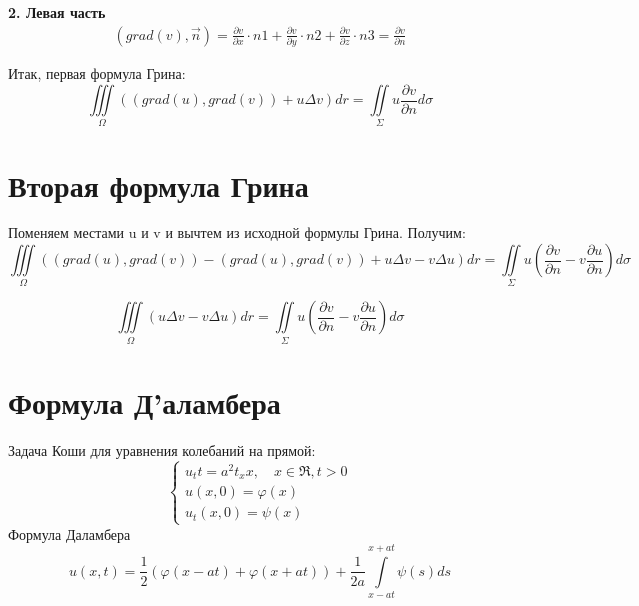 \documentclass[11pt,a4paper]{article}
\begin{document}
\textbf{2. Левая часть} \\
\begin{equation}
\begin{split}
(grad(v), \vec{n}) = \frac{\partial v}{\partial x} \cdot n1 + \frac{\partial v}{\partial y} \cdot n2 + \frac{\partial v}{\partial z} \cdot n3 = \frac{\partial v}{\partial n}
\end{split}
\end{equation}

Итак, первая формула Грина:
$$
\iiint \limits_{\varOmega} ((grad(u), grad(v)) + u\Delta v)dr = \iint \limits_{\Sigma} u  \frac{\partial v}{\partial n} d\sigma
$$

\section{Вторая формула Грина}
Поменяем местами u и v и вычтем из исходной формулы Грина. Получим:
$$
\iiint \limits_{\varOmega} ((grad(u), grad(v)) - (grad(u), grad(v)) + u\Delta v -  v\Delta u)dr = \iint \limits_{\Sigma} u  (\frac{\partial v}{\partial n} -  v  \frac{\partial u}{\partial n}) d\sigma
$$

$$
\iiint \limits_{\varOmega} (u\Delta v -  v\Delta u)dr = \iint \limits_{\Sigma} u  (\frac{\partial v}{\partial n} -  v  \frac{\partial u}{\partial n}) d\sigma
$$

\section{Формула Д'аламбера}
Задача Коши для уравнения колебаний на прямой:
$$
\begin{cases}
	u_tt = a^2t_xx, \quad x \in \Re, t > 0\\
	u(x,0) = \varphi(x) \\
	u_t(x,0) = \psi(x)
\end{cases}
$$
Формула Даламбера
$$
u(x,t) = \frac{1}{2}(\varphi(x-at) + \varphi(x+at)) + \frac{1}{2a} \int\limits_{x-at}^{x+at} \psi(s)ds
$$
\end{document}
